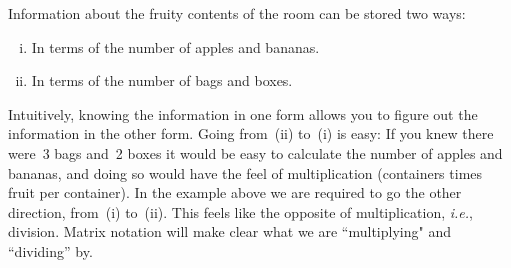 %
\noindent
Information about the fruity contents of the room can be stored two ways: 
\begin{enumerate}[(i)]
\item In terms of the number of apples and bananas. 
\item In terms of the number of bags and boxes. 
\end{enumerate}
Intuitively, knowing the information in one form allows you to figure out the information in the other form. 
Going from~(ii) to~(i) is easy: 
If you knew there were~3 bags and~2 boxes it would be easy to calculate the number of apples and bananas, and doing so would have the feel of multiplication (containers times fruit per container). 
In the example above we are required to go the other direction, from~(i) to~(ii). This  feels like the opposite of multiplication, {\it i.e.}, division. Matrix notation will 
make clear what we are ``multiplying" and ``dividing'' by. 

